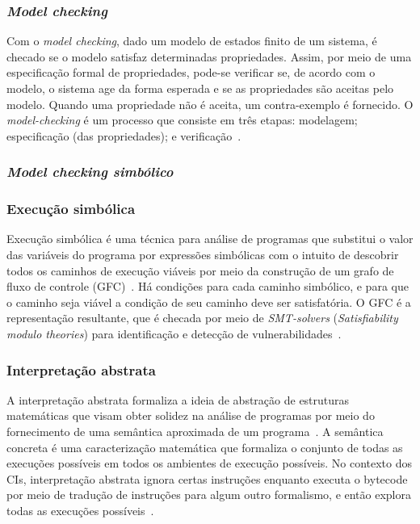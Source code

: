 \subsubsection*{\textbf{\textit{Model checking}}}
Com o \textit{model checking}, dado um modelo de estados finito de um sistema, é checado se o modelo satisfaz determinadas propriedades. Assim, por meio de uma especificação formal de propriedades, pode-se verificar se, de acordo com o modelo, o sistema age da forma esperada e se as propriedades são aceitas pelo modelo. Quando uma propriedade não é aceita, um contra-exemplo é fornecido. O \textit{model-checking} é um processo que consiste em três etapas: modelagem; especificação (das propriedades); e verificação~\cite{clarke2018model}.

\subsubsection*{\textbf{\textit{Model checking simbólico}}}


\subsubsection*{\textbf{Execução simbólica}}
Execução simbólica é uma técnica para análise de programas que substitui o valor das variáveis do programa por expressões simbólicas com o intuito de descobrir todos os caminhos de execução viáveis por meio da construção de um grafo de fluxo de controle (GFC)~\cite{king1976symbolic}. Há condições para cada caminho simbólico, e para que o caminho seja viável a condição de seu caminho deve ser satisfatória. O GFC é a representação resultante, que é checada por meio de \textit{SMT-solvers} (\textit{Satisfiability modulo theories}) para identificação e detecção de vulnerabilidades~\cite{almakhour2020verification-survey}.


\subsubsection*{\textbf{Interpretação abstrata}}
A interpretação abstrata formaliza a ideia de abstração de estruturas matemáticas que visam obter solidez na análise de programas por meio do fornecimento de uma semântica aproximada de um programa~\cite{cousot2012formal}. A semântica concreta é uma caracterização matemática que formaliza o conjunto de todas as execuções possíveis em todos os ambientes de execução possíveis. No contexto dos CIs, interpretação abstrata ignora certas instruções enquanto executa o bytecode por meio de tradução de instruções para algum outro formalismo, e então explora todas as execuções possíveis~\cite{almakhour2020verification-survey}.


